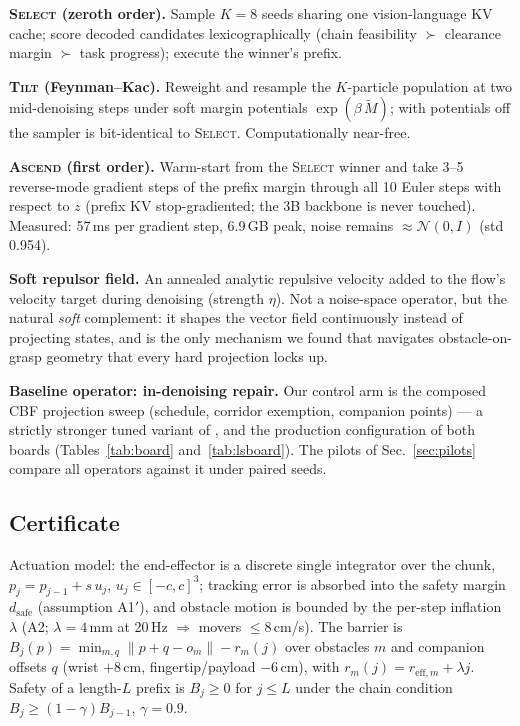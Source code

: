 \documentclass[conference]{IEEEtran}
\begin{document}
\textbf{\textsc{Select} (zeroth order).} Sample $K{=}8$ seeds sharing one vision-language KV cache; score decoded candidates lexicographically (chain feasibility $\succ$ clearance margin $\succ$ task progress); execute the winner's prefix.

\textbf{\textsc{Tilt} (Feynman--Kac).} Reweight and resample the $K$-particle population at two mid-denoising steps under soft margin potentials $\exp(\beta\,\tilde M)$; with potentials off the sampler is bit-identical to \textsc{Select}. Computationally near-free.

\textbf{\textsc{Ascend} (first order).} Warm-start from the \textsc{Select} winner and take 3--5 reverse-mode gradient steps of the prefix margin through all 10 Euler steps with respect to $z$ (prefix KV stop-gradiented; the 3B backbone is never touched). Measured: 57\,ms per gradient step, 6.9\,GB peak, noise remains $\approx\mathcal N(0,I)$ (std 0.954).

\textbf{Soft repulsor field.} An annealed analytic repulsive velocity added to the flow's velocity target during denoising (strength $\eta$). Not a noise-space operator, but the natural \emph{soft} complement: it shapes the vector field continuously instead of projecting states, and is the only mechanism we found that navigates obstacle-on-grasp geometry that every hard projection locks up.

\textbf{Baseline operator: in-denoising repair.} Our control arm is the composed CBF projection sweep (schedule, corridor exemption, companion points) --- a strictly stronger tuned variant of \cite{sota2607}, and the production configuration of both boards (Tables~\ref{tab:board} and~\ref{tab:lsboard}). The pilots of Sec.~\ref{sec:pilots} compare all operators against it under paired seeds.

\subsection{Certificate}
\label{sec:theory}

Actuation model: the end-effector is a discrete single integrator over the chunk, $p_j=p_{j-1}+s\,u_j$, $u_j\in[-c,c]^3$; tracking error is absorbed into the safety margin $d_{\mathrm{safe}}$ (assumption A1$'$), and obstacle motion is bounded by the per-step inflation $\lambda$ (A2; $\lambda=4$\,mm at 20\,Hz $\Rightarrow$ movers $\le$8\,cm/s). The barrier is
$B_j(p)=\min_{m,q}\lVert p+q-o_m\rVert-r_m(j)$
over obstacles $m$ and companion offsets $q$ (wrist $+8$\,cm, fingertip/payload $-6$\,cm), with $r_m(j)=r_{\mathrm{eff},m}+\lambda j$. Safety of a length-$L$ prefix is $B_j\ge0$ for $j\le L$ under the chain condition $B_j\ge(1-\gamma)B_{j-1}$, $\gamma=0.9$.
\end{document}
